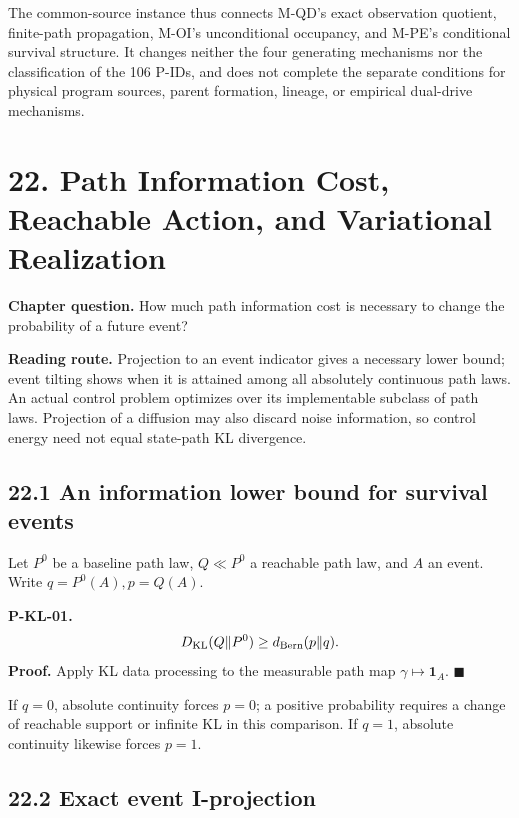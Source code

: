 \documentclass[
  english,
  11pt,
  oneside]{book}
\begin{document}
The common-source instance thus connects M-QD's exact observation quotient, finite-path propagation, M-OI's unconditional occupancy, and M-PE's conditional survival structure. It changes neither the four generating mechanisms nor the classification of the 106 P-IDs, and does not complete the separate conditions for physical program sources, parent formation, lineage, or empirical dual-drive mechanisms.

\chapter{22. Path Information Cost, Reachable Action, and Variational Realization}\label{ch-22}

\textbf{Chapter question.} How much path information cost is necessary to change the probability of a future event?

\textbf{Reading route.} Projection to an event indicator gives a necessary lower bound; event tilting shows when it is attained among all absolutely continuous path laws. An actual control problem optimizes over its implementable subclass of path laws. Projection of a diffusion may also discard noise information, so control energy need not equal state-path KL divergence.

\section{22.1 An information lower bound for survival events}\label{an-information-lower-bound-for-survival-events}

Let \(P^0\) be a baseline path law, \(Q\ll P^0\) a reachable path law, and \(A\) an event. Write \(q=P^0(A),p=Q(A)\).

\hypertarget{p-kl-01}{}\label{p-kl-01}

\textbf{P-KL-01.} \[D_{\rm KL}(Q\|P^0)\ge
d_{\rm Bern}(p\|q).\] \textbf{Proof.} Apply KL data processing to the measurable path map \(\gamma\mapsto\mathbf1_A\). \(\blacksquare\)

If \(q=0\), absolute continuity forces \(p=0\); a positive probability requires a change of reachable support or infinite KL in this comparison. If \(q=1\), absolute continuity likewise forces \(p=1\).

\section{22.2 Exact event I-projection}\label{exact-event-i-projection}
\end{document}
